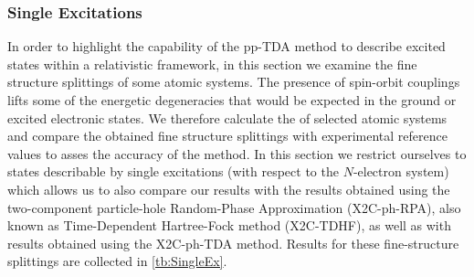 \subsubsection{Single Excitations}
\label{subsec:SingleEx}
In order to highlight the capability of the pp-TDA method to describe excited
states within a relativistic framework, in this section we examine the fine
structure splittings of some atomic systems.  The presence of spin-orbit
couplings 
lifts some of the energetic degeneracies that would be expected in the ground or
excited electronic states.  We therefore calculate the  of selected
atomic systems and compare the obtained fine structure splittings with
experimental reference values\cite{NIST_ASD} to asses the accuracy of the
method.  In this section we restrict ourselves to states describable by single
excitations (with respect to the $N$-electron system) which allows us to also
compare our results with the results obtained using the two-component
particle-hole Random-Phase Approximation (X2C-ph-RPA), also known as
Time-Dependent Hartree-Fock method (X2C-TDHF), as well as with results obtained
using the X2C-ph-TDA method.\cite{Li16_3711} Results for these fine-structure
splittings are collected in \cref{tb:SingleEx}.

